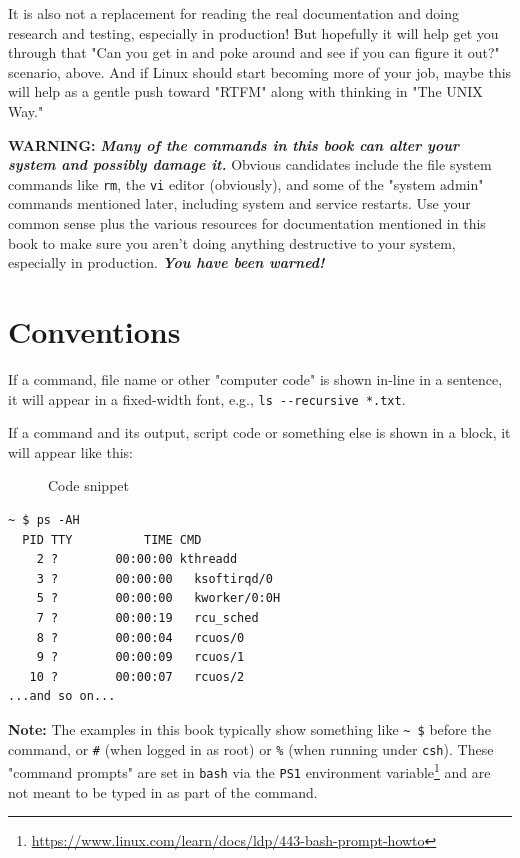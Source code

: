 \documentclass[10pt,]{book}
\renewcommand{\href}[2]{#2\footnote{\url{#1}}}
\numberwithin{figure}{chapter}
\DeclareRobustCommand{\drcap}[1]{\begin{figure}[H]\caption{#1}\end{figure}}
\DeclareRobustCommand{\drenv}[1]{\index{Environment Variables!#1}}
\begin{document}
It is also not a replacement for reading the real documentation and
doing research and testing, especially in production! But hopefully it
will help get you through that "Can you get in and poke around and see
if you can figure it out?" scenario, above. And if Linux should start
becoming more of your job, maybe this will help as a gentle push toward
"RTFM" along with thinking in "The UNIX Way."

\textbf{WARNING:} \textbf{\emph{Many of the commands in this book can
alter your system and possibly damage it.}} Obvious candidates include
the file system commands like \texttt{rm}, the \texttt{vi} editor
(obviously), and some of the "system admin" commands mentioned later,
including system and service restarts. Use your common sense plus the
various resources for documentation mentioned in this book to make sure
you aren't doing anything destructive to your system, especially in
production. \textbf{\emph{You have been warned!}}

\section*{Conventions}\label{conventions}

If a command, file name or other "computer code" is shown in-line in a
sentence, it will appear in a fixed-width font, e.g.,
\texttt{ls -{}-recursive *.txt}.

If a command and its output, script code or something else is shown in a
block, it will appear like this:

\drcap{Code snippet}

\begin{verbatim}
~ $ ps -AH
  PID TTY          TIME CMD
    2 ?        00:00:00 kthreadd
    3 ?        00:00:00   ksoftirqd/0
    5 ?        00:00:00   kworker/0:0H
    7 ?        00:00:19   rcu_sched
    8 ?        00:00:04   rcuos/0
    9 ?        00:00:09   rcuos/1
   10 ?        00:00:07   rcuos/2
...and so on...
\end{verbatim}

\textbf{Note:} The examples in this book typically show something like
\texttt{\textasciitilde{} \$} before the command, or \texttt{\#} (when
logged in as root) or \texttt{\%} (when running under \texttt{csh}).
These "command prompts" are set in \texttt{bash} via the
\href{https://www.linux.com/learn/docs/ldp/443-bash-prompt-howto}{\texttt{PS1}
environment variable}\drenv{PS1} and are not meant to be typed in as
part of the command.
\end{document}
